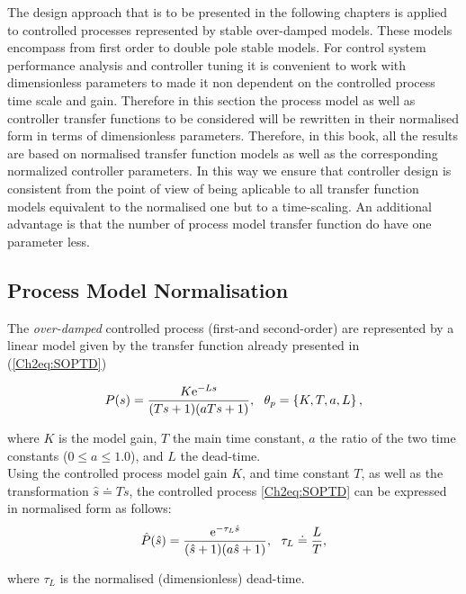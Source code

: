 The design approach that is to be presented in the following chapters is applied to controlled processes represented by stable over-damped models. These models encompass from first order to double pole stable models. For control system performance analysis and controller tuning it is convenient to work with dimensionless parameters to made it non dependent on the controlled process time scale and gain. Therefore in this section the process model as well as controller transfer functions to be considered will be rewritten in their normalised form in terms of dimensionless parameters.  Therefore, in this book, all the results are based on normalised transfer function models as well as the corresponding normalized controller parameters. In this way we ensure that controller design is consistent from the point of view of being aplicable to all transfer function models equivalent to the normalised one but to a time-scaling.  An additional advantage is that the number of process model transfer function do have one parameter less.\\

\subsection{Process Model Normalisation}
\label{sec:4.1}

The \emph{over-damped} controlled process (first-and second-order) are represented by a linear model given by the transfer function already presented in (\ref{Ch2eq:SOPTD})

\begin{equation}
	P(s) = \frac{K \mathrm{e}^{-L s}}{(T s+1)(a T s+1)}, \ \ \theta_p=\left\{K, T, a, L \right\}, 
\end{equation}

\noindent where $K$ is the model gain, $T$ the main time constant, $a$ the ratio of the two time constants ($0 \leq a \leq 1.0$), and $L$ the dead-time.\\

Using the controlled process model gain $K$, and time constant $T$, as well as the transformation $\hat s \doteq T s$, the controlled process \eqref{Ch2eq:SOPTD} can be expressed in normalised form as follows:
\begin{equation}
	\hat P(\hat s) = \frac{\mathrm{e}^{-\tau_L \hat s}}{(\hat s +1)(a \hat s +1)}, \ \ \tau_L \doteq \frac{L}{T}, 
	\label{Ch2eq:SOPTD_n}
\end{equation}

\noindent where $\tau_L$ is the normalised (dimensionless) dead-time.\\

